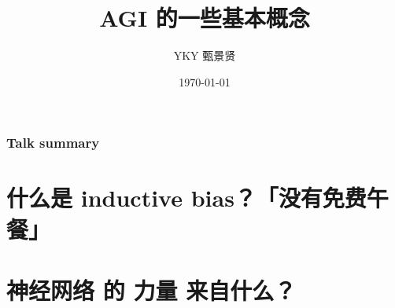 \documentclass[17pt]{beamer}
\title[China AGI group]{AGI 的一些基本概念} %
\author{YKY 甄景贤} %
\institute[] %
{
Independent researcher, Hong Kong \\ %
\medskip
\textit{generic.intelligence@gmail.com} %
}
\date{\today} %
\begin{document}
\frame{\titlepage}

\begin{frame}
\frametitle{Talk summary}
\tableofcontents
\end{frame}

%
%




\section{什么是 inductive bias？「没有免费午餐」}



\section{神经网络 的 力量 来自什么？}
\end{document}
